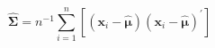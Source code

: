 \begin{equation}
    \widehat{\boldsymbol{\Sigma}}
    =
    n^{-1}
    \sum_{i = 1}^{n}
    \left[
    \left(
    \mathbf{x}_{i}
    -
    \hat{\boldsymbol{\mu}}
    \right)
    \left(
    \mathbf{x}_{i}
    -
    \hat{\boldsymbol{\mu}}
    \right)^{\prime}
    \right]
    \label{eq:sigmaMatrix-sigmacaphat}
\end{equation}
